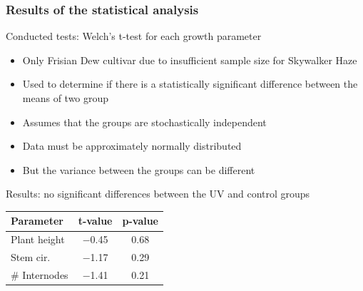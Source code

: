 \documentclass[
    12pt,
    aspectratio=1610,
    bibliography=../bibliography.bib,
    link-citations]{beamer}
\begin{document}
    \begin{frame}
        \frametitle{Results of the statistical analysis}
        \begin{footnotesize}
            \begin{block}{Conducted tests: Welch's t-test for each growth parameter}
                \begin{itemize}
                    \item Only Frisian Dew cultivar due to insufficient sample size for Skywalker Haze
                    \item Used to determine if there is a statistically significant difference between the means of two group
                    \item Assumes that the groups are stochastically independent
                    \item Data must be approximately normally distributed
                    \item But the variance between the groups can be different
                \end{itemize}
            \end{block}
            \begin{block}{Results: no significant differences between the UV and control groups}
                \vspace{0.5em}
                \begin{tabular}{lcc}
                    \hline
                    \hline
                    \textbf{Parameter} & \textbf{t-value} & \textbf{p-value} \\
                    \hline
                    \hline
                    Plant height & \num[mode=text]{-0.45} & \num[mode=text]{0.68} \\
                    Stem cir. & \num[mode=text]{-1.17} & \num[mode=text]{0.29} \\
                    \# Internodes & \num[mode=text]{-1.41} & \num[mode=text]{0.21} \\
                    \hline
                    \hline
                \end{tabular}
            \end{block}
        \end{footnotesize}
    \end{frame}
\end{document}
